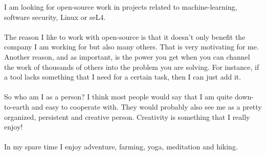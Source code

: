 I am looking for open-source work in projects related to machine-learning, software security, Linux or seL4.\\\\
The reason I like to work with open-source is that it doesn't only benefit the company I am working for but also many others. That is very motivating for me. Another reason, and as important, is the power you get when you can channel the work of thousands of others into the problem you are solving. For instance, if a tool lacks something that I need for a certain task, then I can just add it.\\\\
So who am I as a person? I think most people would say that I am quite down-to-earth and easy to cooperate with. They would probably also see me as a pretty organized, persistent and creative person. Creativity is something that I really enjoy!\\\\
In my spare time I enjoy adventure, farming, yoga, meditation and hiking.
